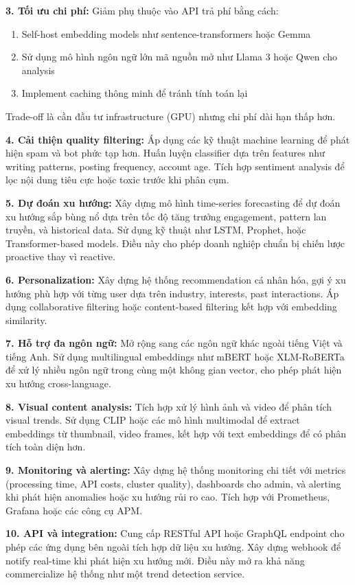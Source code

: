\textbf{3. Tối ưu chi phí:} Giảm phụ thuộc vào API trả phí bằng cách:
\begin{enumerate}
    \item Self-host embedding models như sentence-transformers hoặc Gemma
    \item Sử dụng mô hình ngôn ngữ lớn mã nguồn mở như Llama 3 hoặc Qwen cho analysis
    \item Implement caching thông minh để tránh tính toán lại
\end{enumerate}
Trade-off là cần đầu tư infrastructure (GPU) nhưng chi phí dài hạn thấp hơn.

\textbf{4. Cải thiện quality filtering:} Áp dụng các kỹ thuật machine learning để phát hiện spam và bot phức tạp hơn. Huấn luyện classifier dựa trên features như writing patterns, posting frequency, account age. Tích hợp sentiment analysis để lọc nội dung tiêu cực hoặc toxic trước khi phân cụm.

\textbf{5. Dự đoán xu hướng:} Xây dựng mô hình time-series forecasting để dự đoán xu hướng sắp bùng nổ dựa trên tốc độ tăng trưởng engagement, pattern lan truyền, và historical data. Sử dụng kỹ thuật như LSTM, Prophet, hoặc Transformer-based models. Điều này cho phép doanh nghiệp chuẩn bị chiến lược proactive thay vì reactive.

\textbf{6. Personalization:} Xây dựng hệ thống recommendation cá nhân hóa, gợi ý xu hướng phù hợp với từng user dựa trên industry, interests, past interactions. Áp dụng collaborative filtering hoặc content-based filtering kết hợp với embedding similarity.

\textbf{7. Hỗ trợ đa ngôn ngữ:} Mở rộng sang các ngôn ngữ khác ngoài tiếng Việt và tiếng Anh. Sử dụng multilingual embeddings như mBERT hoặc XLM-RoBERTa để xử lý nhiều ngôn ngữ trong cùng một không gian vector, cho phép phát hiện xu hướng cross-language.

\textbf{8. Visual content analysis:} Tích hợp xử lý hình ảnh và video để phân tích visual trends. Sử dụng CLIP hoặc các mô hình multimodal để extract embeddings từ thumbnail, video frames, kết hợp với text embeddings để có phân tích toàn diện hơn.

\textbf{9. Monitoring và alerting:} Xây dựng hệ thống monitoring chi tiết với metrics (processing time, API costs, cluster quality), dashboards cho admin, và alerting khi phát hiện anomalies hoặc xu hướng rủi ro cao. Tích hợp với Prometheus, Grafana hoặc các công cụ APM.

\textbf{10. API và integration:} Cung cấp RESTful API hoặc GraphQL endpoint cho phép các ứng dụng bên ngoài tích hợp dữ liệu xu hướng. Xây dựng webhook để notify real-time khi phát hiện xu hướng mới. Điều này mở ra khả năng commercialize hệ thống như một trend detection service.

